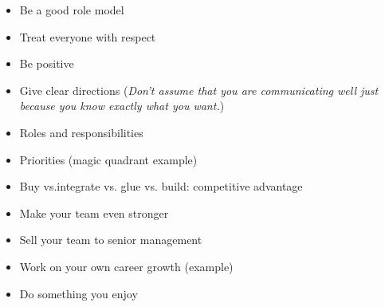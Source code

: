 \documentclass{slides}
\newcommand{\bi}{\begin{itemize}}
\newcommand{\ei}{\end{itemize}}
\begin{document}
\bi
\item Be a good role model
\item Treat everyone with respect
\item Be positive
\item Give clear directions (\emph{Don't assume that you are 
  communicating well just because you know exactly what you want.})
\ei


\bi
\item Roles and responsibilities
\item Priorities (magic quadrant example)
\item Buy vs.integrate vs. glue vs. build: competitive advantage
\ei


\bi
\item Make your team even stronger
\item Sell your team to senior management
\item Work on your own career growth (example)
\item Do something you enjoy
\ei
\end{document}

